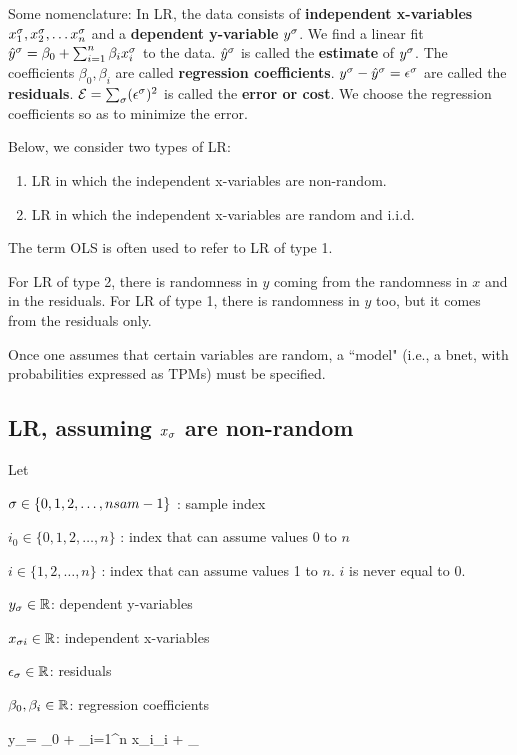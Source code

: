 Some nomenclature: In LR, the 
data consists of 
{\bf independent x-variables} $x^\sigma_1,
 x^\sigma_2, \ldots x^\sigma_n$ 
and a {\bf dependent y-variable} $y^\sigma$.
We find a linear fit ${\hat{y}}^\sigma =
\beta_0 + \sum_{i=1}^n \beta_i x^\sigma_i$
to the data. 
${\hat{y}}^\sigma$ is called the {\bf estimate}
of $y^\sigma$.
 The coefficients $\beta_0, \beta_i$
are called {\bf regression coefficients}.
$y^\sigma-{\hat{y}}^\sigma=\epsilon^\sigma$
are called  the {\bf residuals}.
${\cal E} =\sum_\sigma (\epsilon^\sigma)^2$
is called the {\bf error or cost}. We choose the 
regression coefficients
so as to minimize the error.

Below, we consider two types of LR:

\begin{enumerate}
\item
LR
in which the independent x-variables are non-random.
\item
LR
in which the independent x-variables are random
and i.i.d.
\end{enumerate}

The  term OLS
is often used to refer to LR 
of type 1.



For LR of type 2,
there is randomness in $y$ 
coming from the randomness in $x$
and in the residuals.
For LR of type 1,
there  is randomness in $y$
too, but
it comes 
from the residuals
only. 

Once one assumes that certain
variables are random, a ``model" (i.e., a bnet,
with probabilities expressed as TPMs)
 must be 
specified.


\subsection{LR, assuming
$x_\sigma$ are non-random}

Let

$\sigma\in\{0, 1, 2, \ldots, nsam-1\}$ : sample index

$i_0\in\{0, 1, 2, \ldots, n\}$ : 
index that can assume values 0 to $n$

$i\in\{1, 2, \ldots, n\}$ : 
index that can assume values 1 to $n$.
$i$ is never equal to 0.


$y_\sigma\in { \mathbb{R}}$: dependent y-variables

$x_{\sigma i}\in { \mathbb{R}}$: independent x-variables

$\epsilon_\sigma\in { \mathbb{R}}$: residuals

$\beta_0, \beta_i\in { \mathbb{R}}$: 
regression coefficients


\beq
y_\s= \beta_0 +
\sum_{i=1}^{n} x_{\s i}\beta_{i} + \eps_\s
\label{eq-LR-start}
\eeq


